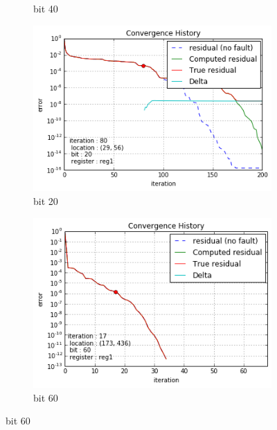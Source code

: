 \begin{figure}[h]
\begin{minipage}[b]{0.48\linewidth}
\begin{subfigure}[t]{\linewidth}
		\caption{bit 40}\label{fig:gre_216a_conv_hist_bit_1}
	\end{subfigure}
    \quad
    \begin{subfigure}[t]{\linewidth}
		\centering
		\includegraphics[width=\linewidth]{figures/gre_216a/convergence_history_bit_2.png}
		\caption{bit 20}\label{fig:gre_216a_conv_hist_bit_2}
	\end{subfigure}
    \end{minipage}
    \quad
    \begin{minipage}[b]{0.48\linewidth}
    	\begin{subfigure}[t]{\linewidth}
		\centering
		\includegraphics[width=\linewidth]{figures/pores_2/convergence_history_bit_0.png}
		\caption{bit 60}\label{fig:pores_2_conv_hist_bit_0}		
	\end{subfigure}

\end{minipage}
\end{figure}
